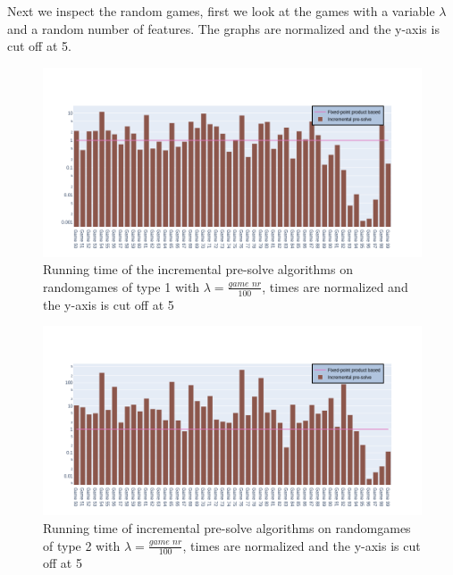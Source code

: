 Next we inspect the random games, first we look at the games with a variable $\lambda$ and a random number of features. The graphs are normalized and the y-axis is cut off at 5.
\begin{figure}[H]
	\includegraphics[width=1\linewidth]{"results/FF_randomgames/Fixed-point product based_Incremental pre-solve_"}
	\caption{Running time of the incremental pre-solve algorithms on randomgames of type 1 with $\lambda = \frac{\textit{game nr}}{100}$, times are normalized and the y-axis is cut off at 5}
	\label{fig:elevatorzlnks}
\end{figure}%
\begin{figure}[H]
	\includegraphics[width=1\linewidth]{"results/FC_randomgames/Fixed-point product based_Incremental pre-solve_"}
	\caption{Running time of incremental pre-solve algorithms on randomgames of type 2 with $\lambda = \frac{\textit{game nr}}{100}$, times are normalized and the y-axis is cut off at 5}
	\label{fig:elevatorzlnks}
\end{figure}%
